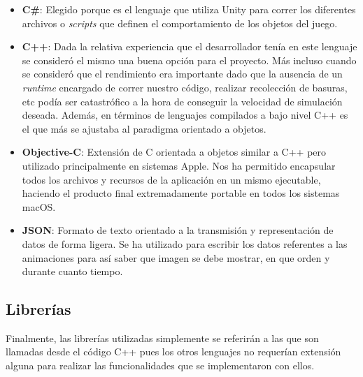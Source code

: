 \begin{itemize}
	\item \textbf{C\#}: Elegido porque es el lenguaje que utiliza Unity para correr los diferentes archivos o \textit{scripts} que definen el comportamiento de los objetos del juego.
	\item \textbf{C++}: Dada la relativa experiencia que el desarrollador tenía en este lenguaje se consideró el mismo una buena opción para el proyecto. Más incluso cuando se consideró que el rendimiento era importante dado que la ausencia de un \textit{runtime} encargado de correr nuestro código, realizar recolección de basuras, etc podía ser catastrófico a la hora de conseguir la velocidad de simulación deseada. Además, en términos de lenguajes compilados a bajo nivel C++ es el que más se ajustaba al paradigma orientado a objetos.
	\item \textbf{Objective-C}: Extensión de C orientada a objetos similar a C++ pero utilizado principalmente en sistemas Apple. Nos ha permitido encapsular todos los archivos y recursos de la aplicación en un mismo ejecutable, haciendo el producto final extremadamente portable en todos los sistemas macOS. 
	\item \textbf{JSON}: Formato de texto orientado a la transmisión y representación de datos de forma ligera. Se ha utilizado para escribir los datos referentes a las animaciones para así saber que imagen se debe mostrar, en que orden y durante cuanto tiempo. 
\end{itemize}

\subsection{Librerías}

Finalmente, las librerías utilizadas simplemente se referirán a las que son llamadas desde el código C++ pues los otros lenguajes no requerían extensión alguna para realizar las funcionalidades que se implementaron con ellos.

